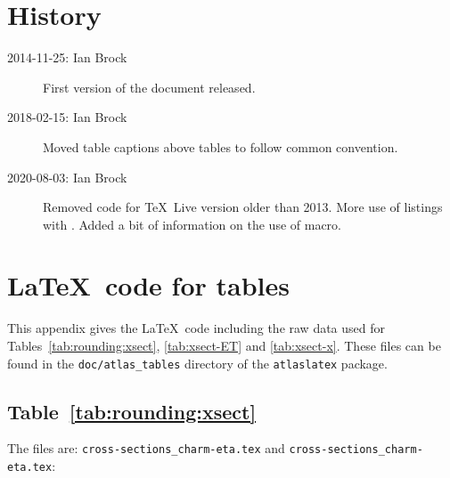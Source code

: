 \documentclass[UKenglish, texlive=2016]{atlasdoc}
\begin{document}
\clearpage
\section*{History}

\begin{description}
\item[2014-11-25: Ian Brock] First version of the document released.
\item[2018-02-15: Ian Brock] Moved table captions above tables to follow common convention.
\item[2020-08-03: Ian Brock] Removed code for \TeX\ Live version older than 2013.
  More use of listings with .
  Added a bit of information on the use of  macro.
\end{description}


\printbibliography
% 
% 

\clearpage
\appendix
\section{\LaTeX\ code for tables}
\label{sec:raw-data}

This appendix gives the \LaTeX\ code including the raw data used for
Tables~\ref{tab:rounding:xsect},
\ref{tab:xsect-ET} and \ref{tab:xsect-x}.
These files can be found in the \texttt{doc/atlas\_tables} directory
of the \texttt{atlaslatex} package.

\subsection{Table~\protect\ref{tab:rounding:xsect}}

The files are: \texttt{cross-sections\_charm-eta.tex} and
\texttt{cross-sections\_charm-eta.tex}:

\end{document}
